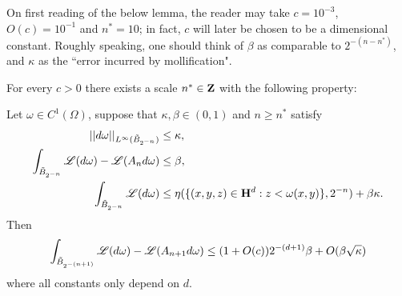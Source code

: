 On first reading of the below lemma, the reader may take $c = 10^{-3}$, $O(c) = 10^{-1}$ and $n^* = 10$; in fact, $c$ will later be chosen to be a dimensional constant.
Roughly speaking, one should think of $\beta$ as comparable to $2^{-(n - n^*)}$, and $\kappa$ as the ``error incurred by mollification".

\begin{lemma}\label{DGL1}
For every $c > 0$ there exists a scale $n^* \in \mathbf{Z}$ with the following property:

Let $\omega \in C^1(\Omega)$, suppose that $\kappa, \beta \in (0, 1)$ and $n \geq n^*$ satisfy
\begin{align}
||d\omega||_{L^\infty(\tilde B_{2^{-n}})} &\leq \kappa, \label{DGL1 1}\\
\int_{\tilde B_{2^{-n}}} \mathscr L(d\omega) - \mathscr L(A_n d\omega) &\leq \beta, \label{DGL1 2}\\
\int_{\tilde B_{2^{-n}}} \mathscr L(d\omega) &\leq \eta(\{(x, y, z) \in \mathbf H^d: z < \omega(x, y)\}, 2^{-n}) + \beta \kappa. \label{DGL1 3}
\end{align}
Then
$$\int_{\tilde B_{2^{-(n + 1)}}}\mathscr L(d\omega) - \mathscr L(A_{n + 1} d\omega) \leq (1 + O(c)) 2^{-(d + 1)} \beta + O(\beta \sqrt \kappa)$$
where all constants only depend on $d$.
\end{lemma}
